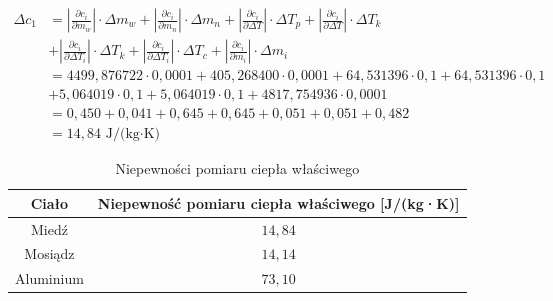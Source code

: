 \documentclass[a4paper,12pt]{article}
\begin{document}
\begin{align*}
    \Delta c_1 & = \left|\frac{\partial c_i}{\partial m_w}\right| \cdot \Delta m_w + \left|\frac{\partial c_i}{\partial m_n}\right| \cdot \Delta m_n + \left|\frac{\partial c_i}{\partial \Delta T}\right| \cdot \Delta T_p + \left|\frac{\partial c_i}{\partial \Delta T}\right| \cdot \Delta T_k \\
               & + \left|\frac{\partial c_i}{\partial \Delta T_i}\right| \cdot \Delta T_k + \left|\frac{\partial c_i}{\partial \Delta T_i}\right| \cdot \Delta T_c + \left|\frac{\partial c_i}{\partial m_i}\right| \cdot \Delta m_i                                                               \\
               & = 4499{,}876722 \cdot 0{,}0001 + 405{,}268400 \cdot 0{,}0001 + 64{,}531396 \cdot 0{,}1 + 64{,}531396 \cdot 0{,}1                                                                                                                                                                  \\
               & + 5{,}064019 \cdot 0{,}1 + 5{,}064019 \cdot 0{,}1 + 4817{,}754936 \cdot 0{,}0001                                                                                                                                                                                                  \\
               & = 0{,}450 + 0{,}041 + 0{,}645 + 0{,}645 + 0{,}051 + 0{,}051 + 0{,}482                                                                                                                                                                                                             \\
               & = 14{,}84\,\text{J/(kg$\cdot$K)}
\end{align*}


\begin{table}[H]
    \centering
    \begin{tabular}{|c|c|}
        \hline
        \textbf{Ciało} & \textbf{Niepewność pomiaru ciepła właściwego [J/(kg·K)]} \\
        \hline
        Miedź & $14{,}84$ \\
        \hline
        Mosiądz & $14{,}14$ \\
        \hline
        Aluminium & $73{,}10$ \\
        \hline
    \end{tabular}
    \caption{Niepewności pomiaru ciepła właściwego}
    \label{tab:niepewnosci_cieplo_wlasciwe}
\end{table}
\end{document}
